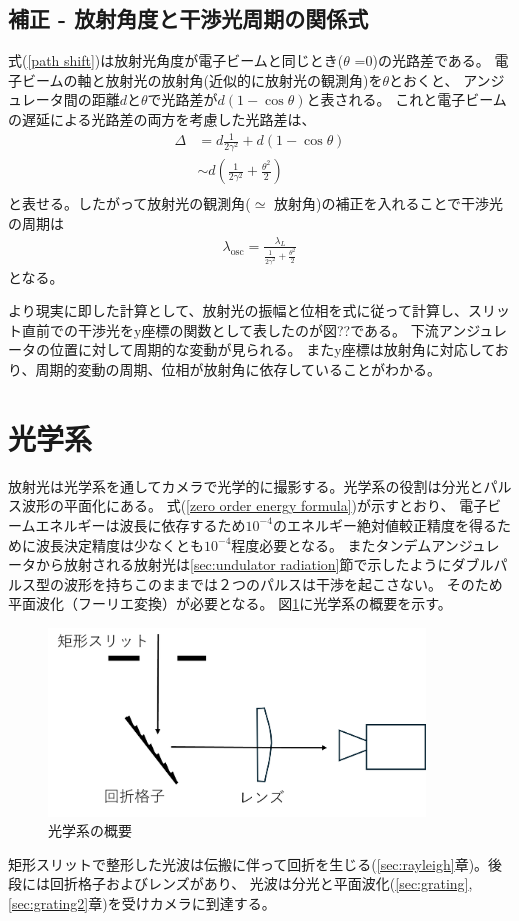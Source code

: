 \documentclass[a4paper,11pt,uplatex]{jsbook}
\begin{document}
\subsection{補正 - 放射角度と干渉光周期の関係式}
式(\ref*{path shift})は放射光角度が電子ビームと同じとき($\theta$ =0)の光路差である。
電子ビームの軸と放射光の放射角(近似的に放射光の観測角)を$\theta$とおくと、
アンジュレータ間の距離$d$と$\theta$で光路差が$d(1-\cos{\theta})$と表される。
これと電子ビームの遅延による光路差の両方を考慮した光路差は、
\begin{eqnarray}
  \Delta &= d\frac{1}{2\gamma^2} + d(1 - \cos{\theta}) \\
        &\sim d(\frac{1}{2\gamma^2} + \frac{\theta^2}{2})\\
\end{eqnarray}
と表せる。したがって放射光の観測角($\simeq$ 放射角)の補正を入れることで干渉光の周期は
\begin{eqnarray}
  \lambda_{\text{osc}} = \frac{\lambda_L}{\frac{1}{2\gamma^2} + \frac{\theta^2}{2}}
\end{eqnarray}
となる。

より現実に即した計算として、放射光の振幅と位相を式に従って計算し、スリット直前での干渉光をy座標の関数として表したのが図??である。
下流アンジュレータの位置に対して周期的な変動が見られる。
またy座標は放射角に対応しており、周期的変動の周期、位相が放射角に依存していることがわかる。


\section{光学系}\label{sec:optics}
放射光は光学系を通してカメラで光学的に撮影する。光学系の役割は分光とパルス波形の平面化にある。
式(\ref{zero order energy formula})が示すとおり、
電子ビームエネルギーは波長に依存するため$10^{-4}$のエネルギー絶対値較正精度を得るために波長決定精度は少なくとも$10^{-4}$程度必要となる。
またタンデムアンジュレータから放射される放射光は\ref{sec:undulator radiation}節で示したようにダブルパルス型の波形を持ちこのままでは２つのパルスは干渉を起こさない。
そのため平面波化（フーリエ変換）が必要となる。
図\ref{optics_schematic}に光学系の概要を示す。
\begin{figure}[b]
  \centering
  \includegraphics[width=10cm]{image/2-opticsshematic.png}
  \caption{光学系の概要}
  \label{optics_schematic}
\end{figure}
矩形スリットで整形した光波は伝搬に伴って回折を生じる(\ref{sec:rayleigh}章)。後段には回折格子およびレンズがあり、
光波は分光と平面波化(\ref{sec:grating},\ref{sec:grating2}章)を受けカメラに到達する。
\end{document}
